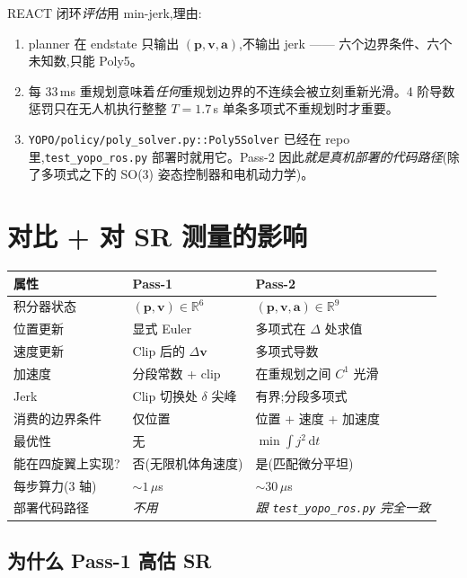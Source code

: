 \documentclass[UTF8, 11pt]{ctexart}
\newcommand{\R}{\mathbb{R}}
\newcommand{\dt}{\,\mathrm{d}t}
\begin{document}
REACT 闭环\emph{评估}用 min-jerk,理由:
\begin{enumerate}
  \item planner 在 endstate 只输出 $(\bm{p}, \bm{v}, \bm{a})$,不输出 jerk —— 六个边界条件、六个未知数,只能 Poly5。
  \item 每 33\,ms 重规划意味着\emph{任何}重规划边界的不连续会被立刻重新光滑。4 阶导数惩罚只在无人机执行整整 $T = 1.7\,$s 单条多项式不重规划时才重要。
  \item \texttt{YOPO/policy/poly\_solver.py::Poly5Solver} 已经在 repo 里,\texttt{test\_yopo\_ros.py} 部署时就用它。Pass-2 因此\emph{就是真机部署的代码路径}(除了多项式之下的 SO(3) 姿态控制器和电机动力学)。
\end{enumerate}

\section{对比 + 对 SR 测量的影响}

\begin{center}
\begin{tabular}{lll}
\hline
属性 & Pass-1 & Pass-2 \\
\hline
积分器状态                & $(\bm{p}, \bm{v}) \in \R^6$ & $(\bm{p}, \bm{v}, \bm{a}) \in \R^9$ \\
位置更新                 & 显式 Euler & 多项式在 $\Delta$ 处求值 \\
速度更新                 & Clip 后的 $\Delta\bm{v}$ & 多项式导数 \\
加速度                   & 分段常数 + clip & 在重规划之间 $C^1$ 光滑 \\
Jerk                    & Clip 切换处 $\delta$ 尖峰 & 有界;分段多项式 \\
消费的边界条件             & 仅位置 & 位置 + 速度 + 加速度 \\
最优性                   & 无 & $\min \int j^2 \dt$ \\
能在四旋翼上实现?           & 否(无限机体角速度) & 是(匹配微分平坦) \\
每步算力(3 轴)            & ${\sim}1\,\mu$s & ${\sim}30\,\mu$s \\
部署代码路径               & \emph{不用} & \emph{跟 \texttt{test\_yopo\_ros.py} 完全一致} \\
\hline
\end{tabular}
\end{center}

\subsection{为什么 Pass-1 高估 SR}
\end{document}

